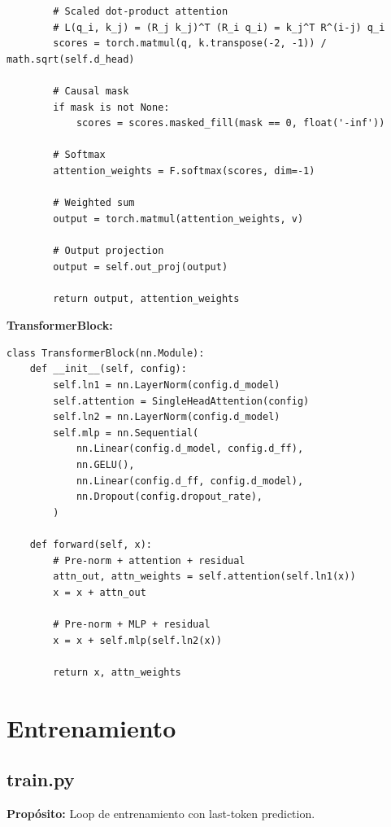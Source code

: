 \documentclass[12pt,a4paper]{report}
\begin{document}
\begin{lstlisting}
        # Scaled dot-product attention
        # L(q_i, k_j) = (R_j k_j)^T (R_i q_i) = k_j^T R^(i-j) q_i
        scores = torch.matmul(q, k.transpose(-2, -1)) / math.sqrt(self.d_head)

        # Causal mask
        if mask is not None:
            scores = scores.masked_fill(mask == 0, float('-inf'))

        # Softmax
        attention_weights = F.softmax(scores, dim=-1)

        # Weighted sum
        output = torch.matmul(attention_weights, v)

        # Output projection
        output = self.out_proj(output)

        return output, attention_weights
\end{lstlisting}

\textbf{TransformerBlock:}

\begin{lstlisting}
class TransformerBlock(nn.Module):
    def __init__(self, config):
        self.ln1 = nn.LayerNorm(config.d_model)
        self.attention = SingleHeadAttention(config)
        self.ln2 = nn.LayerNorm(config.d_model)
        self.mlp = nn.Sequential(
            nn.Linear(config.d_model, config.d_ff),
            nn.GELU(),
            nn.Linear(config.d_ff, config.d_model),
            nn.Dropout(config.dropout_rate),
        )
    
    def forward(self, x):
        # Pre-norm + attention + residual
        attn_out, attn_weights = self.attention(self.ln1(x))
        x = x + attn_out

        # Pre-norm + MLP + residual
        x = x + self.mlp(self.ln2(x))

        return x, attn_weights
\end{lstlisting}

\section{Entrenamiento}
\label{sec:entrenamiento}

\subsection{train.py}
\label{subsec:train}

\textbf{Propósito:} Loop de entrenamiento con last-token prediction.
\end{document}
